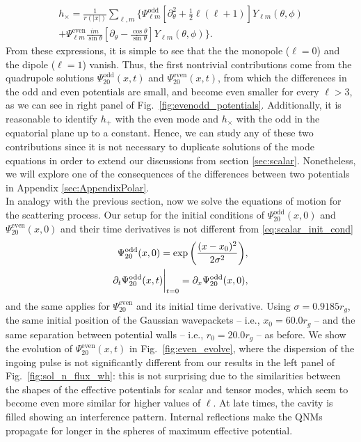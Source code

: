 \documentclass[article,aps,nofootinbib,twocolumn,superscriptaddress]{revtex4-1}
\begin{document}
\begin{align}
\displaystyle{h_{\times}=\frac{1}{r(|x|)}\sum_{\ell,m}\bigg\{\Psi_{\ell m}^{\mathrm{odd}}\left[\partial^2_{\theta}+\frac{1}{2}\ell(\ell+1)\right]Y_{\ell m}(\theta,\phi)}\nonumber\\
\displaystyle{+\Psi_{\ell m}^{\mathrm{even}}\frac{i m}{\sin\theta}\left[\partial_{\theta}-\frac{\cos\theta}{\sin\theta}\right]Y_{\ell m}(\theta,\phi)\bigg\}}.
\label{eq:hx}
\end{align}
From these expressions, it is simple to see that the the monopole ($\ell=0$) and the dipole ($\ell=1$) vanish. Thus, the first nontrivial contributions come from the quadrupole solutions $\Psi_{20}^{\mathrm{odd}}(x,t)$ and $\Psi_{20}^{\mathrm{even}}(x,t)$, from which the differences in the odd and even potentials are small, and become even smaller for every $\ell>3$, as we can see in right panel of Fig.~\ref{fig:evenodd_potentials}. Additionally, it is reasonable to identify $h_+$ with the even mode and  $h_{\times}$ with the odd in the equatorial plane up to a constant. Hence, we can study any of these two contributions since it is not necessary to duplicate solutions of the mode equations in order to extend our discussions from section \ref{sec:scalar}. Nonetheless, we will explore one of the consequences of the differences between two potentials in Appendix \ref{sec:AppendixPolar}.\\ 

In analogy with the previous section, now we solve the equations of motion for the scattering process. Our setup for the initial conditions of $\Psi_{20}^{\mathrm{odd}}(x,0)$ and $\Psi_{20}^{\mathrm{even}}(x,0)$ and their time derivatives is not different from \eqref{eq:scalar_init_cond}  
\begin{align}
\displaystyle{\Psi^{\mathrm{odd}}_{20}(x,0)=\exp\left(\frac{(x-x_0)^2}{2\sigma^2}\right)},\nonumber\\
\displaystyle{\partial_t \Psi^{\mathrm{odd}}_{20}(x,t)\bigg{|}_{t=0}=\partial_x\Psi^{\mathrm{odd}}_{20}(x,0)},
\label{eq:tensor_init_cond}
\end{align}
and the same applies for $\Psi^\mathrm{even}_{20}$ and its initial time derivative. Using $\sigma=0.9185r_g$, the same initial position of the Gaussian wavepackets -- i.e., $x_0=60.0r_g$ -- and the same separation between potential walls -- i.e., $r_0=20.0r_g$ -- as before. We show the evolution of $\Psi_{20}^{\mathrm{even}}(x,t)$ in Fig.~\ref{fig:even_evolve}, where the dispersion of the ingoing pulse is not significantly different from our results in the left panel of Fig.~\ref{fig:sol_n_flux_wh}: this is not surprising due to the similarities between the shapes of the effective potentials for scalar and tensor modes, which seem to become even more similar for higher values of $\ell$. At late times, the cavity is filled showing an interference pattern. Internal reflections make the QNMs propagate for longer in the spheres of maximum effective potential.
\end{document}
